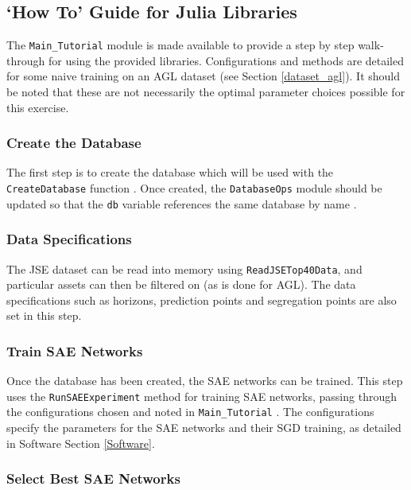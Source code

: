 \documentclass[a4paper,11pt,oneside]{article}
\theoremstyle{plain}
\theoremstyle{definition}
\begin{document}
	\newpage	
	\subsection{`How To' Guide for Julia Libraries}\label{appendix_tutorial}

	The \texttt{Main\_Tutorial} module is made available to provide a step by step walk-through for using the provided libraries. Configurations and methods are detailed for some naive training on an AGL dataset (see Section \ref{dataset_agl}). It should be noted that these are not necessarily the optimal parameter choices possible for this exercise.

	\subsubsection{Create the Database}
	
	The first step is to create the database which will be used with the \texttt{CreateDatabase} function \citep{DCDatabaseCreator}. Once created, the \texttt{DatabaseOps} module should be updated so that the \texttt{db} variable references the same database by name \citep{DCDatabaseOps}.
	
	\subsubsection{Data Specifications}
	
	The JSE dataset can be read into memory using \texttt{ReadJSETop40Data}, and particular assets can then be filtered on (as is done for AGL). The data specifications such as horizons, prediction points and segregation points are also set in this step.
	
	\subsubsection{Train SAE Networks}

	Once the database has been created, the SAE networks can be trained. This step uses the \texttt{RunSAEExperiment} method for training SAE networks, passing through the configurations chosen and noted in \texttt{Main\_Tutorial} \citep{DCExperimentProcessTrainSAE}. The configurations specify the parameters for the SAE networks and their SGD training, as detailed in Software Section \ref{Software}.

	\subsubsection{Select Best SAE Networks}
	
\end{document}
